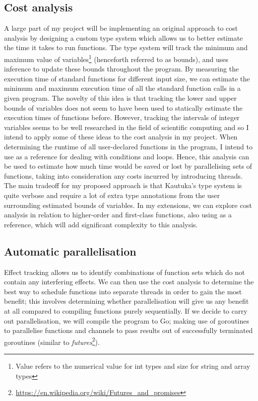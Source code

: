 \documentclass[12pt,a4paper,twoside]{article}
\begin{document}
\subsection*{Cost analysis}

A large part of my project will be implementing an original approach to cost analysis by designing a custom type system which allows us to better estimate the time it takes to run functions. The type system will track the minimum and maximum value of variables\footnote{Value refers to the numerical value for int types and size for string and array types} (henceforth referred to as bounds), and uses inference to update these bounds throughout the program. By measuring the execution time of standard functions for different input size, we can estimate the minimum and maximum execution time of all the standard function calls in a given program. The novelty of this idea is that tracking the lower and upper bounds of variables does not seem to have been used to statically estimate the execution times of functions before. However, tracking the intervals of integer variables seems to be well researched in the field of scientific computing and so I intend to apply some of these ideas to the cost analysis in my project. When determining the runtime of all user-declared functions in the program, I intend to use \cite{10.1145/361002.361016} as a reference for dealing with conditions and loops. Hence, this analysis can be used to estimate how much time would be saved or lost by parallelising sets of functions, taking into consideration any costs incurred by introducing threads. The main tradeoff for my proposed approach is that Kautuka's type system is quite verbose and require a lot of extra type annotations from the user surrounding estimated bounds of variables. In my extensions, we can explore cost analysis in relation to higher-order and first-class functions, also using \cite{10.1145/361002.361016} as a reference, which will add significant complexity to this analysis.

\subsection*{Automatic parallelisation}

Effect tracking allows us to identify combinations of function sets which do not contain any interfering effects. We can then use the cost analysis to determine the best way to schedule functions into separate threads in order to gain the most benefit; this involves determining whether parallelisation will give us any benefit at all compared to compiling functions purely sequentially. If we decide to carry out parallelisation, we will compile the program to Go; making use of goroutines to parallelise functions and channels to pass results out of successfully terminated goroutines (similar to \textit{futures}\footnote{\url{https://en.wikipedia.org/wiki/Futures_and_promises}}).
\end{document}
